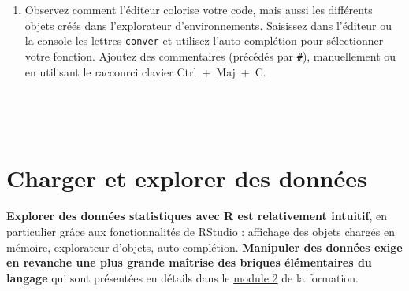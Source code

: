 \documentclass[12pt,twosided, notitlepage]{book}
\newenvironment{Shaded}{}{}
\newcommand{\KeywordTok}[1]{\textcolor[rgb]{0.00,0.00,1.00}{#1}}
\newcommand{\DecValTok}[1]{#1}
\newcommand{\StringTok}[1]{\textcolor[rgb]{0.00,0.50,0.50}{#1}}
\newcommand{\CommentTok}[1]{\textcolor[rgb]{0.00,0.50,0.00}{#1}}
\newcommand{\ControlFlowTok}[1]{\textcolor[rgb]{0.00,0.00,1.00}{#1}}
\newcommand{\OperatorTok}[1]{#1}
\newcommand{\NormalTok}[1]{#1}
\renewenvironment{Shaded}{\begin{snugshade}}{\end{snugshade}}
\begin{document}
\begin{enumerate}
\begin{Shaded}
\end{Shaded}

  \begin{center} \rule{0.5\linewidth}{\linethickness}\end{center}

  \bigskip  \fi 
\item
  Observez comment l'éditeur colorise votre code, mais aussi les
  différents objets créés dans l'explorateur d'environnements. Saisissez
  dans l'éditeur ou la console les lettres \texttt{conver} et utilisez
  l'auto-complétion pour sélectionner votre fonction. Ajoutez des
  commentaires (précédés par \texttt{\#}), manuellement ou en utilisant
  le raccourci clavier Ctrl~+~Maj~+~C.
\end{enumerate}

~

~

\section{Charger et explorer des
données}\label{charger-et-explorer-des-donnees}

\textbf{Explorer des données statistiques avec R est relativement
intuitif}, en particulier grâce aux fonctionnalités de RStudio :
affichage des objets chargés en mémoire, explorateur d'objets,
auto-complétion. \textbf{Manipuler des données exige en revanche une
plus grande maîtrise des briques élémentaires du langage} qui sont
présentées en détails dans le \underline{module 2} de la formation.
\end{document}
